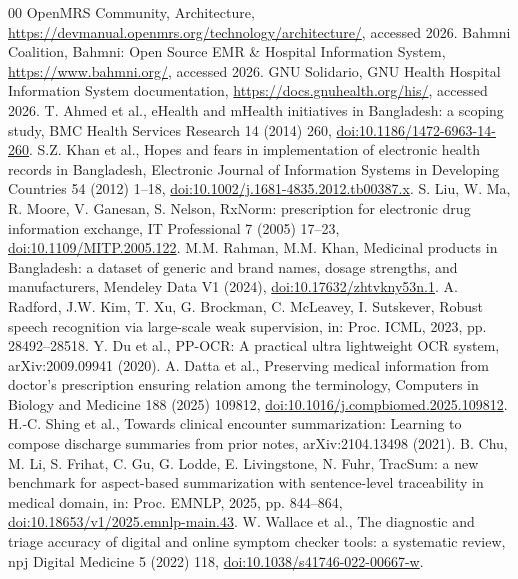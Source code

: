 \documentclass[preprint,12pt,a4paper]{elsarticle}
\begin{document}
\begin{thebibliography}{00}
 OpenMRS Community, Architecture, \url{https://devmanual.openmrs.org/technology/architecture/}, accessed 2026.
 Bahmni Coalition, Bahmni: Open Source EMR \& Hospital Information System, \url{https://www.bahmni.org/}, accessed 2026.
 GNU Solidario, GNU Health Hospital Information System documentation, \url{https://docs.gnuhealth.org/his/}, accessed 2026.
 T. Ahmed et al., eHealth and mHealth initiatives in Bangladesh: a scoping study, BMC Health Services Research 14 (2014) 260, \href{https://doi.org/10.1186/1472-6963-14-260}{doi:10.1186/1472-6963-14-260}.
 S.Z. Khan et al., Hopes and fears in implementation of electronic health records in Bangladesh, Electronic Journal of Information Systems in Developing Countries 54 (2012) 1--18, \href{https://doi.org/10.1002/j.1681-4835.2012.tb00387.x}{doi:10.1002/j.1681-4835.2012.tb00387.x}.
 S. Liu, W. Ma, R. Moore, V. Ganesan, S. Nelson, RxNorm: prescription for electronic drug information exchange, IT Professional 7 (2005) 17--23, \href{https://doi.org/10.1109/MITP.2005.122}{doi:10.1109/MITP.2005.122}.
 M.M. Rahman, M.M. Khan, Medicinal products in Bangladesh: a dataset of generic and brand names, dosage strengths, and manufacturers, Mendeley Data V1 (2024), \href{https://doi.org/10.17632/zhtvkny53n.1}{doi:10.17632/zhtvkny53n.1}.
 A. Radford, J.W. Kim, T. Xu, G. Brockman, C. McLeavey, I. Sutskever, Robust speech recognition via large-scale weak supervision, in: Proc. ICML, 2023, pp. 28492--28518.
 Y. Du et al., PP-OCR: A practical ultra lightweight OCR system, arXiv:2009.09941 (2020).
 A. Datta et al., Preserving medical information from doctor's prescription ensuring relation among the terminology, Computers in Biology and Medicine 188 (2025) 109812, \href{https://doi.org/10.1016/j.compbiomed.2025.109812}{doi:10.1016/j.compbiomed.2025.109812}.
 H.-C. Shing et al., Towards clinical encounter summarization: Learning to compose discharge summaries from prior notes, arXiv:2104.13498 (2021).
 B. Chu, M. Li, S. Frihat, C. Gu, G. Lodde, E. Livingstone, N. Fuhr, TracSum: a new benchmark for aspect-based summarization with sentence-level traceability in medical domain, in: Proc. EMNLP, 2025, pp. 844--864, \href{https://doi.org/10.18653/v1/2025.emnlp-main.43}{doi:10.18653/v1/2025.emnlp-main.43}.
 W. Wallace et al., The diagnostic and triage accuracy of digital and online symptom checker tools: a systematic review, npj Digital Medicine 5 (2022) 118, \href{https://doi.org/10.1038/s41746-022-00667-w}{doi:10.1038/s41746-022-00667-w}.

\end{thebibliography}
\end{document}
